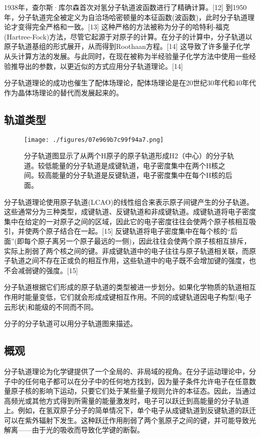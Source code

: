 1938年，查尔斯·库尔森首次对氢分子轨道波函数进行了精确计算。[12] 到1950年，分子轨道完全被定义为自洽场哈密顿量的本征函数(波函数)，此时分子轨道理论才变得完全严格和一致。[13] 这种严格的方法被称为分子的哈特利-福克(Hartree-Fock)方法，尽管它起源于对原子的计算。在分子的计算中，分子轨道以原子轨道基组的形式展开，从而得到Roothaan方程。[14] 这导致了许多量子化学从头计算方法的发展。与此同时，在现在被称为半经验量子化学方法中使用一些经验推导出的参数，以更近似的方式应用分子轨道理论。[14]

分子轨道理论的成功也催生了配体场理论，配体场理论是在20世纪30年代和40年代作为晶体场理论的替代而发展起来的。

\subsection{轨道类型}

\begin{figure}[ht]
\centering
\texttt{[image: ./figures/07e969b7c99f94a7.png]}
\caption{分子轨道图显示了从两个H原子的原子轨道形成H2（中心）的分子轨道。较低能量的分子轨道是成键轨道，电子密度集中在两个H核之间。较高能量的分子轨道是反键轨道，电子密度集中在每个H核的后面。} \label{fig_MOFa_1}
\end{figure}

分子轨道理论使用原子轨道(LCAO)的线性组合来表示原子间键产生的分子轨道。这些通常分为三种类型，成键轨道、反键轨道和非成键轨道。成键轨道将电子密度集中在给定的一对原子之间的区域，因此它的电子密度往往会使两个原子核相互吸引，并使两个原子结合在一起。[15] 反键轨道将电子密度集中在每个核的“后面”(即每个原子离另一个原子最远的一侧)，因此往往会使两个原子核相互排斥，实际上削弱了两个核之间的键。非成键轨道中的电子往往与原子轨道相关联，而原子轨道之间不存在正或负的相互作用，这些轨道中的电子既不会增加键的强度，也不会减弱键的强度。[15]

分子轨道根据它们形成的原子轨道的类型被进一步划分。如果化学物质的轨道相互作用时能量变低，它们就会形成成键相互作用。不同的成键轨道因电子构型(电子云形状)和能级的不同而不同。

分子的分子轨道可以用分子轨道图来描述。

\subsection{概观}

分子轨道理论为化学键提供了一个全局的、非局域的视角。在分子运动理论中，分子中的任何电子都可以在分子中的任何地方找到，因为量子条件允许电子在任意数量原子核的影响下运动，只要它们处于某些量子规则允许的本征态。因此，当通过高频光或其他方式得到所需量的能量激发时，电子可以跃迁到高能量的分子轨道上。例如，在氢双原子分子的简单情况下，单个电子从成键轨道到反键轨道的跃迁可以在紫外辐射下发生。这种跃迁作用削弱了两个氢原子之间的键，并可能导致光解离——由于光的吸收而导致化学键的断裂。

